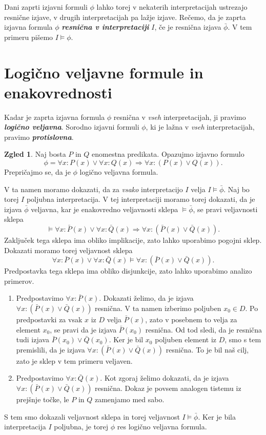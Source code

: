 \documentclass[11pt]{book}
\def\definicija{\color{rdeca}\bf\em}
\theoremstyle{definition}
\theoremstyle{zgled}
\newtheorem*{zgled}{Zgled}
\theoremstyle{odprtproblem}
\theoremstyle{domacanaloga}
\theoremstyle{izrek}
\begin{document}
Dani zaprti izjavni formuli $\phi$ lahko torej v nekaterih interpretacijah ustrezajo resnične izjave, v drugih interpretacijah pa lažje izjave. Rečemo, da je zaprta izjavna formula $\phi$ {\definicija resnična v interpretaciji} $I$, če je resnična izjava $\bar \phi$. V tem primeru pišemo $I \models \phi$.

\section{Logično veljavne formule in enakovrednosti}

Kadar je zaprta izjavna formula $\phi$ resnična v \emph{vseh} interpretacijah, ji pravimo {\definicija logično veljavna}. Sorodno izjavni formuli $\phi$, ki je lažna v \emph{vseh} interpretacijah, pravimo {\definicija protislovna}.

\begin{zgled}
Naj bosta $P$ in $Q$ enomestna predikata. Opazujmo izjavno formulo
\[
    \phi = \forall x \colon P(x) \lor \forall x \colon Q(x) \Rightarrow \forall x \colon (P(x) \lor Q(x)).
\]
Prepričajmo se, da je $\phi$ logično veljavna formula.

V ta namen moramo dokazati, da za \emph{vsako} interpretacijo $I$ velja $I \models \bar \phi$. Naj bo torej $I$ poljubna interpretacija. V tej interpretaciji moramo torej dokazati, da je izjava $\bar \phi$ veljavna, kar je enakovredno veljavnosti sklepa $\models \bar \phi$, se pravi veljavnosti sklepa
\[
    \models 
    \forall x \colon \bar P(x) \lor \forall x \colon \bar Q(x) \Rightarrow \forall x \colon (\bar P(x) \lor \bar Q(x)).
\]
Zaključek tega sklepa ima obliko implikacije, zato lahko uporabimo pogojni sklep. Dokazati moramo torej veljavnost sklepa
\[
    \forall x \colon \bar P(x) \lor \forall x \colon \bar Q(x)
    \models
    \forall x \colon (\bar P(x) \lor \bar Q(x)).
\]
Predpostavka tega sklepa ima obliko disjunkcije, zato lahko uporabimo analizo primerov.
\begin{enumerate}
    \item Predpostavimo $\forall x \colon \bar P(x)$. Dokazati želimo, da je izjava $\forall x \colon (\bar P(x) \lor \bar Q(x))$ resnična. V ta namen izberimo poljuben $x_0 \in D$. Po predpostavki za vsak $x$ iz $D$ velja $\bar P(x)$, zato v posebnem to velja za element $x_0$, se pravi da je izjava $\bar P(x_0)$ resnična. Od tod sledi, da je resnična tudi izjava $\bar P(x_0) \lor \bar Q(x_0)$. Ker je bil $x_0$ poljuben element iz $D$, smo s tem premislili, da je izjava $\forall x \colon (\bar P(x) \lor \bar Q(x))$ resnična. To je bil naš cilj, zato je sklep v tem primeru veljaven.
    \item Predpostavimo $\forall x \colon \bar Q(x)$. Kot zgoraj želimo dokazati, da je izjava $\forall x \colon (\bar P(x) \lor \bar Q(x))$ resnična. Dokaz je povsem analogen tistemu iz prejšnje točke, le $P$ in $Q$ zamenjamo med sabo.
\end{enumerate}
S tem smo dokazali veljavnost sklepa in torej veljavnost $I \models \bar \phi$. Ker je bila interpretacija $I$ poljubna, je torej $\phi$ res logično veljavna formula.
\end{zgled}
\end{document}
